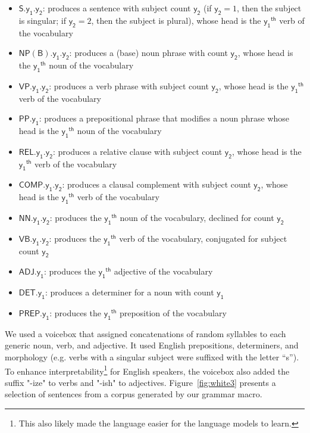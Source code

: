\documentclass[11pt,a4paper]{article}
\renewcommand{\bnfpn}[1]{\mathsf{#1}}
\begin{document}
\begin{itemize}
	\item $\bnfpn{S.y_1.y_2}$: produces a sentence with subject count $\bnfpn{y_2}$ (if $\bnfpn{y_2}=1$, then the subject is singular; if $\bnfpn{y_2}=2$, then the subject is plural), whose head is the $\bnfpn{y_1}^{\mathsf{th}}$ verb of the vocabulary
	\item $\bnfpn{NP(B).y_1.y_2}$: produces a (base) noun phrase with count $\bnfpn{y_2}$, whose head is the $\bnfpn{y_1}^{\mathsf{th}}$ noun of the vocabulary
	\item $\bnfpn{VP.y_1.y_2}$: produces a verb phrase with subject count $\bnfpn{y_2}$, whose head is the $\bnfpn{y_1}^{\mathsf{th}}$ verb of the vocabulary
	\item $\bnfpn{PP.y_1}$: produces a prepositional phrase that modifies a noun phrase whose head is the $\bnfpn{y_1}^{\mathsf{th}}$ noun of the vocabulary
	\item $\bnfpn{REL.y_1.y_2}$: produces a relative clause with subject count $\bnfpn{y_2}$, whose head is the $\bnfpn{y_1}^{\mathsf{th}}$ verb of the vocabulary
	\item $\bnfpn{COMP.y_1.y_2}$: produces a clausal complement with subject count $\bnfpn{y_2}$, whose head is the $\bnfpn{y_1}^{\mathsf{th}}$ verb of the vocabulary
	\item $\bnfpn{NN.y_1.y_2}$: produces the $\bnfpn{y_1}^{\mathsf{th}}$ noun of the vocabulary, declined for count $\bnfpn{y_2}$
	\item $\bnfpn{VB.y_1.y_2}$: produces the $\bnfpn{y_1}^{\mathsf{th}}$ verb of the vocabulary, conjugated for subject count $\bnfpn{y_2}$
	\item $\bnfpn{ADJ.y_1}$: produces the $\bnfpn{y_1}^{\mathsf{th}}$ adjective of the vocabulary
	\item $\bnfpn{DET.y_1}$: produces a determiner for a noun with count $\bnfpn{y_1}$
	\item $\bnfpn{PREP.y_1}$: produces the $\bnfpn{y_1}^{\mathsf{th}}$ preposition of the vocabulary
\end{itemize}

We used a voicebox that assigned concatenations of random syllables to each generic noun, verb, and adjective. It used English prepositions, determiners, and morphology (e.g. verbs with a singular subject were suffixed with the letter ``s''). To enhance interpretability\footnote{This also likely made the language easier for the language models to learn.} for English speakers, the voicebox also added the suffix "-ize" to verbs and "-ish" to adjectives. Figure~\ref{fig:white3} presents a selection of sentences from a corpus generated by our grammar macro.
\end{document}
